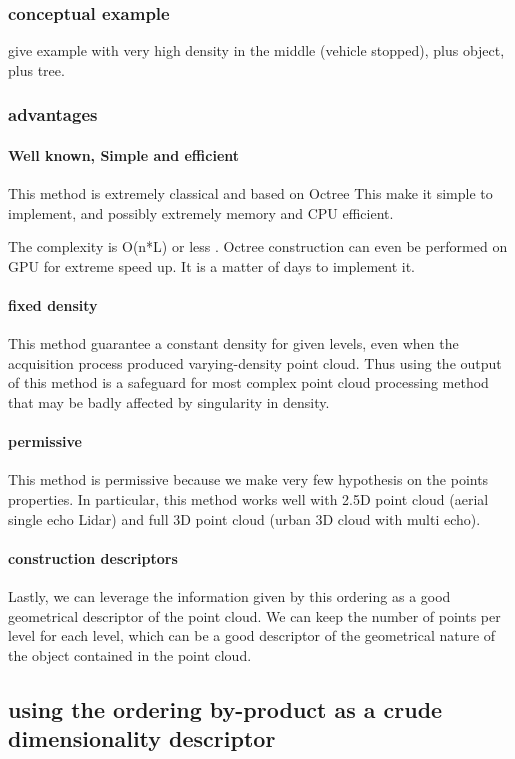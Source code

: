 			
		\subsubsection{conceptual example}
			give example with very high density in the middle (vehicle stopped), plus object, plus tree.
			
			
		\subsubsection{advantages}	
			\paragraph{Well known, Simple and efficient}
				This method is extremely classical and based on Octree This make it simple to implement, and possibly extremely memory and CPU efficient.

				The complexity is O(n*L) or less .				
				Octree construction can even be performed on GPU for extreme speed up.
				It is a matter of days to implement it.
			\paragraph{fixed density}
				This method guarantee a constant density for given levels, even when the acquisition process produced varying-density point cloud.
				Thus using the output of this method is a safeguard for most complex point cloud processing method that may be badly affected by singularity in density.
			\paragraph{permissive}
				This method is permissive because we make very few hypothesis on the points properties. In particular, this method works well with 2.5D point cloud (aerial single echo Lidar) and full 3D point cloud (urban 3D cloud with multi echo).
			\paragraph{construction descriptors}
				Lastly, we can leverage the information given by this ordering as a good geometrical descriptor of the point cloud.
				We can keep the number of points per level for each level, which can be a good descriptor of the geometrical nature of the object contained in the point cloud.
				
	\subsection{using the ordering by-product as a crude dimensionality descriptor}
